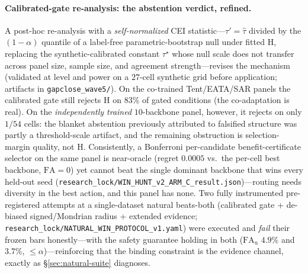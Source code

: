 \documentclass[conference]{IEEEtran}
\theoremstyle{plain}
\theoremstyle{definition}
\begin{document}
\paragraph{Calibrated-gate re-analysis: the abstention verdict, refined.} A post-hoc
re-analysis with a \emph{self-normalized} CEI statistic---$\tau'=\hat\tau$ divided by the
$(1{-}\alpha)$ quantile of a label-free parametric-bootstrap null under fitted H, replacing the
synthetic-calibrated constant $\tau^\star$ whose null scale does not transfer across panel size,
sample size, and agreement strength---revises the mechanism (validated at level and power on a
$27$-cell synthetic grid before application; artifacts in \texttt{gapclose\_wave5/}). On the
co-trained Tent/EATA/SAR panels the calibrated gate still rejects H on $83\%$ of gated
conditions (the co-adaptation is real). On the \emph{independently trained} $10$-backbone panel,
however, it rejects on only $1/54$ cells: the blanket abstention previously attributed to
falsified structure was partly a threshold-scale artifact, and the remaining obstruction is
selection-margin quality, not H. Consistently, a Bonferroni per-candidate benefit-certificate
selector on the same panel is near-oracle (regret $0.0005$ vs.\ the per-cell best backbone,
$\mathrm{FA}{=}0$) yet cannot beat the single dominant backbone that wins every held-out seed
(\texttt{research\_lock/WIN\_HUNT\_v2\_ARM\_C\_result.json})---routing needs diversity in the
best action, and this panel has none. Two fully instrumented pre-registered attempts at a
single-dataset natural beats-both (calibrated gate + de-biased signed/Mondrian radius + extended
evidence; \texttt{research\_lock/NATURAL\_WIN\_PROTOCOL\_v1.yaml}) were executed and \emph{fail}
their frozen bars honestly---with the safety guarantee holding in both
($\mathrm{FA}_{\mathrm u}$ $4.9\%$ and $3.7\%$, ${\le}\alpha$)---reinforcing that the binding
constraint is the evidence channel, exactly as \S\ref{sec:natural-suite} diagnoses.
\end{document}
